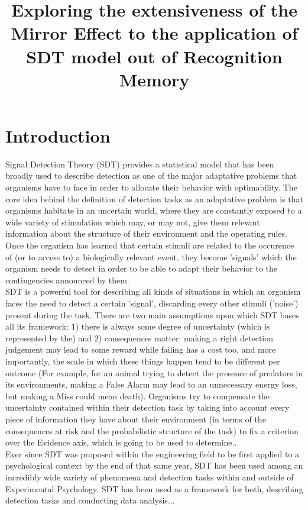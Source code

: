 \documentclass[jou,apacite]{apa6}
\title{Exploring the extensiveness of the Mirror Effect to the application of SDT model out of Recognition Memory}
\begin{document}
\maketitle 

\section{Introduction}

Signal Detection Theory (SDT) provides a statistical model that has been broadly used to describe detection as one of the major adaptative problems that organisms have to face in order to allocate their behavior with optimability. The core idea behind the definition of detection tasks as an adaptative problem is that organisms habitate in an uncertain world, where they are constantly exposed to a wide variety of stimulation which may, or may not, give them relevant information about the structure of their environment and the operating rules. Once the organism has learned that certain stimuli are related to the occurence of (or to access to) a biologically relevant event, they become 'signals' which the organism needs to detect in order to be able to adapt their behavior to the contingencies announced by them. \\

SDT is a powerful tool for describing all kinds of situations in which an organism faces the need to detect a certain 'signal', discarding every other stimuli ('noise') present during the task. There are two main assumptions upon which SDT bases all its framework: 1) there is always some degree of uncertainty (which is represented by the) and 2) consequences matter: making a right detection judgement may lead to some reward while failing has a cost too, and more importantly, the scale in which these things happen tend to be different per outcome (For example, for an animal trying to detect the presence of predators in its environments, making a False Alarm may lead to an unnecessary energy loss, but making a Miss could mean death). Organisms try to compensate the uncertainty contained within their detection task by taking into account every piece of information they have about their environment (in terms of the consequences at risk and the probabilistic structure of the task) to fix a criterion over the Evidence axis, which is going to be used to determine..\\

Ever since SDT was proposed within the engineering field to be first applied to a psychological context by the end of that same year, SDT has been used among an incredibly wide variety of phenomena and detection tasks within and outside of Experimental Psychology. SDT has been used as a framework for both, describing detection tasks and conducting data analysis...\\
\end{document}
